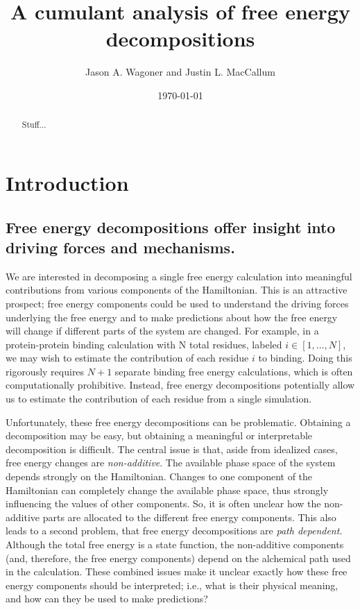 \documentclass{article}
\begin{document}
\title{A cumulant analysis of free energy decompositions}
\author{Jason A. Wagoner and Justin L. MacCallum}

\date{ \today}

\maketitle

\begin{abstract}
Stuff...
\end{abstract}


\section{Introduction}

\subsection{Free energy decompositions offer insight into driving forces and mechanisms.}

We are interested in decomposing a single free energy calculation into meaningful contributions from various components of the Hamiltonian. 
This is an attractive prospect; free energy components could be used to understand the driving forces underlying the free energy and to make predictions about how the free energy will change if different parts of the system are changed. For example, in a protein-protein binding calculation with N total residues, labeled $i \in \left[1, \ldots,N\right]$, we may wish to estimate the contribution of each residue $i$ to binding. Doing this rigorously requires $N+1$ separate binding free energy calculations, which is often computationally prohibitive. Instead, free energy decompositions potentially allow us to estimate the contribution of each residue from a single simulation.

Unfortunately, these free energy decompositions can be problematic. Obtaining a decomposition may be easy, but obtaining a meaningful or interpretable decomposition is difficult. The central issue is that, aside from idealized cases, free energy changes are \textit{non-additive}. The available phase space of the system depends strongly on the Hamiltonian. Changes to one component of the Hamiltonian can completely change the available phase space, thus strongly influencing the values of other components. So, it is often unclear how the non-additive parts are allocated to the different free energy components. This also leads to a second problem, that free energy decompositions are \textit{path dependent}. Although the total free energy is a state function, the non-additive components (and, therefore, the free energy components) depend on the alchemical path used in the calculation. These combined issues make it unclear exactly how these free energy components should be interpreted; i.e., what is their physical meaning, and how can they be used to make predictions? 
\end{document}
